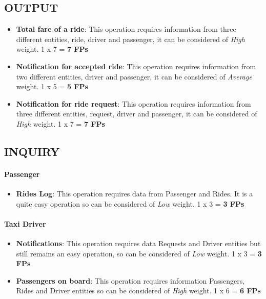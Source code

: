 \subsection{OUTPUT}
    \begin{itemize}
        \item \textbf{Total fare of a ride}: This operation requires information from three different entities, ride, driver and passenger, it can be considered of \textit{High} weight. 1 x 7 = \textbf{7 FPs}
        \item \textbf{Notification for accepted ride}: This operation requires information from two different entities, driver and passenger, it can be considered of \textit{Average} weight. 1 x 5 = \textbf{5 FPs}
        \item \textbf{Notification for ride request}: This operation requires information from three different entities, request, driver and passenger, it can be considered of \textit{High} weight. 1 x 7 = \textbf{7 FPs}
    \end{itemize}

\subsection{INQUIRY}
    \paragraph {Passenger}
        \begin{itemize}
            \item \textbf{Rides Log}: This operation requires data from Passenger and Rides. It is a quite easy operation so can be considered of \textit{Low} weight. 1 x 3 = \textbf{3 FPs}
        \end{itemize}
    
    \paragraph{Taxi Driver}
        \begin{itemize}
            \item \textbf{Notifications}: This operation requires data Requests and Driver entities but still remains an easy operation, so can be considered of \textit{Low} weight. 1 x 3 = \textbf{3 FPs}
            \item \textbf{Passengers on board}: This operation requires information Passengers, Rides and Driver entities so can be considered of \textit{High} weight. 1 x 6 = \textbf{6 FPs}
        \end{itemize}

